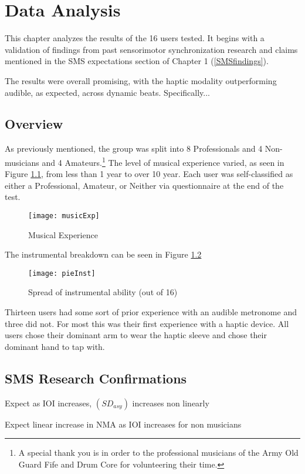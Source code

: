 \chapter{Data Analysis} \label{DataAnalysis}
This chapter analyzes the results of the 16 users tested. It begins with a validation of findings from past sensorimotor synchronization research and claims mentioned in the SMS expectations section of Chapter 1 (\ref{SMSfindings}). 

The results were overall promising, with the haptic modality outperforming audible, as expected, across dynamic beats. Specifically...

\section{Overview}
As previously mentioned, the group was split into 8 Professionals and 4 Non-musicians and 4 Amateurs.\footnote{A special thank you is in order to the professional musicians of the Army Old Guard Fife and Drum Core for volunteering their time.} The level of musical experience varied, as seen in Figure \ref{fig:musicExp}, from less than 1 year to over 10 year. Each user was self-classified as either a Professional, Amateur, or Neither via questionnaire at the end of the test.

\begin{figure}[H]\label{fig:musicExp}
    \centering
    \texttt{[image: musicExp]}
    \caption{Musical Experience}
\end{figure}

The instrumental breakdown can be seen in Figure \ref{fig:pieInst}
\begin{figure}[H]\label{fig:pieInst}
    \centering
    \texttt{[image: pieInst]}
    \caption{Spread of instrumental ability (out of 16)}
\end{figure}

Thirteen users had some sort of prior experience with an audible metronome and three did not. For most this was their first experience with a haptic device. All users chose their dominant arm to wear the haptic sleeve and chose their dominant hand to tap with.

\section{SMS Research Confirmations}
Expect as IOI increases, $(SD_{asy})$ increases non linearly

Expect linear increase in NMA as IOI increases for non musicians

